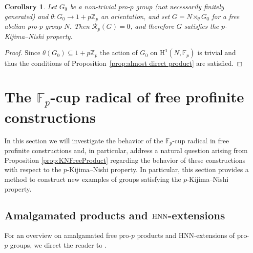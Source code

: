 \documentclass{amsart}
\newtheorem{cor}[thm]{Corollary}
\theoremstyle{definition}
\theoremstyle{remark}
\newcommand{\HNN}{{\rm HNN}}
\newcommand{\ZZ}{\mathbb{Z}}
\newcommand{\FF}{\mathbb{F}}
\newcommand{\calR}{\mathcal{R}}
\newcommand{\rmH}{\mathrm H}%
\begin{document}
\begin{cor}
\label{cor:KNsemidirect}
    Let $G_0$ be a non-trivial pro-$p$ group (not necessarily finitely generated)  and $\theta:G_0\to 1+p\ZZ_p$ an orientation, and set $G=N\rtimes_\theta G_0$ for a free abelian pro-$p$ group $N$. Then $\calR_p(G)=0$, and therefore $G$ satisfies the $p$-Kijima--Nishi property.
\end{cor}
\begin{proof}
    Since $\theta(G_0)\subseteq 1+p\ZZ_p$ the action of $G_0$ on $\rmH^1(N,\FF_p)$ is trivial and thus the conditions of Proposition~\ref{prop:almost direct product} are satisfied.
\end{proof}



\section{The \texorpdfstring{$\FF_p$}{}-cup radical of free profinite constructions}
\label{sec:Radicals of graph fundamental groups}

In this section we will investigate the behavior of the $\FF_p$-cup radical in free profinite constructions and, in particular, address a natural question arising from Proposition \ref{prop:KNFreeProduct} regarding the behavior of these constructions with respect to  the $p$-Kijima--Nishi property. In particular, this section provides a method to construct new examples of groups satisfying the $p$-Kijima--Nishi property.

\subsection{Amalgamated products and $\HNN$-extensions}

For an overview on amalgamated free pro-$p$ products and HNN-extensions of pro-$p$ groups, we direct the reader to \cite[\S 9.2--9.4]{RibesZalesskii2010}. 
\end{document}

